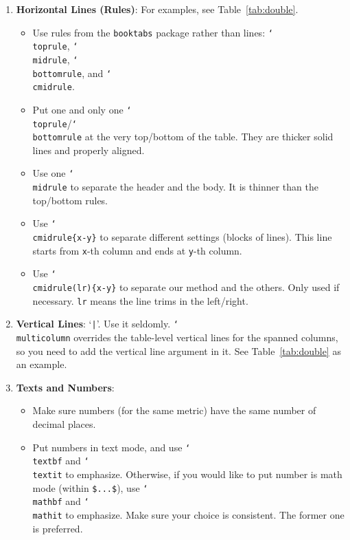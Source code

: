 \begin{enumerate}
  \item \textbf{Horizontal Lines (Rules)}: For examples, see Table~\ref{tab:double}.
  \begin{itemize}
    \item
      Use rules from the \texttt{booktabs} package rather than lines: \texttt{\char`\\toprule}, \texttt{\char`\\midrule}, \texttt{\char`\\bottomrule}, and \texttt{\char`\\cmidrule}.
    \item
      Put one and only one \texttt{\char`\\toprule}/\texttt{\char`\\bottomrule} at the very top/bottom of the table.
      They are thicker solid lines and properly aligned.
    \item
      Use one \texttt{\char`\\midrule} to separate the header and the body.
      It is thinner than the top/bottom rules.
    \item
      Use \texttt{\char`\\cmidrule\{x-y\}} to separate different settings (blocks of lines).
      This line starts from \texttt{x}-th column and ends at \texttt{y}-th column.
    \item
      Use \texttt{\char`\\cmidrule(lr)\{x-y\}} to separate our method and the others.
      Only used if necessary.
      \texttt{lr} means the line trims in the left/right.

  \end{itemize}

  \item \textbf{Vertical Lines}:
    `\texttt{|}'. Use it seldomly.
    \texttt{\char`\\multicolumn} overrides the table-level vertical lines for the spanned columns, so you need to add the vertical line argument in it. See Table~\ref{tab:double} as an example.

  \item \textbf{Texts and Numbers}:
  \begin{itemize}
    \item Make sure numbers (for the same metric) have the same number of decimal places.
    \item
      Put numbers in text mode, and use \texttt{\char`\\textbf} and \texttt{\char`\\textit} to emphasize.
      Otherwise, if you would like to put number is math mode (within \texttt{\$...\$}), use \texttt{\char`\\mathbf} and  \texttt{\char`\\mathit} to emphasize.
      Make sure your choice is consistent. The former one is preferred.
  \end{itemize}

\end{enumerate}


